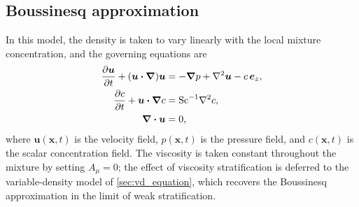 \subsection{Boussinesq approximation}
\label{sec:bq_equation}
In this model, the density is taken to vary linearly with the local mixture concentration, and the governing equations are
\begin{subequations}
    \label{eq:bq_nl_continuous}
    \begin{align}
        \label{eq:bq_nl_continuous_momentum}
        \frac{\partial \boldsymbol{u}}{\partial t} + (\boldsymbol{u}\boldsymbol{\cdot}\boldsymbol{\nabla})\boldsymbol{u} &= -\boldsymbol{\nabla} p + \nabla^{2}\boldsymbol{u} - c\,\boldsymbol{e}_{z}, \\
        \label{eq:bq_nl_continuous_scalar}
        \frac{\partial c}{\partial t} + \boldsymbol{u}\boldsymbol{\cdot}\boldsymbol{\nabla} c &= \mathrm{Sc}^{-1}\nabla^{2}c, \\
        \label{eq:bq_nl_continuous_continuity}
        \boldsymbol{\nabla}\boldsymbol{\cdot}\boldsymbol{u} &= 0,
    \end{align}
\end{subequations}
where \(\boldsymbol{u}(\boldsymbol{x},t)\) is the velocity field, \(p(\boldsymbol{x},t)\) is the pressure field, and \(c(\boldsymbol{x},t)\) is the scalar concentration field. The viscosity is taken constant throughout the mixture by setting \(A_{\mu}=0\); the effect of viscosity stratification is deferred to the variable-density model of \cref{sec:vd_equation}, which recovers the Boussinesq approximation in the limit of weak stratification.

